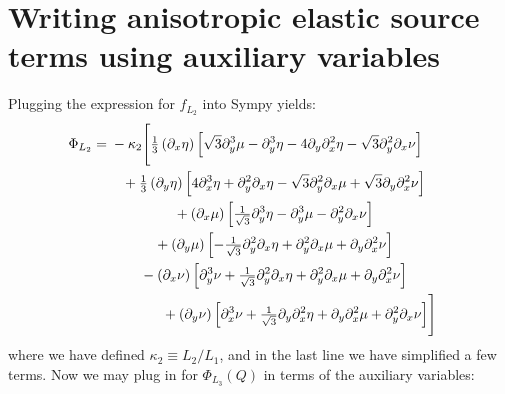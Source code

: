 \documentclass[reqno]{article}
\begin{document}
\section{Writing anisotropic elastic source terms using auxiliary variables}
Plugging the expression for $f_{L_2}$ into Sympy yields:
\begin{equation}
\begin{split}
	\Phi_{L_2} 
	&=
	\begin{multlined}[t]
	- \kappa_2 \Biggl[
	\tfrac13 \left(\partial_x \eta\right) \Bigl[
	\sqrt3 \partial_y^3 \mu
	- \partial_y^3 \eta 
	- 4 \partial_y \partial_x^2 \eta 
	- \sqrt3 \partial_y^2 \partial_x \nu
	\Bigr] \\ 
	+ \tfrac13 \left(\partial_y \eta\right) \Bigl[
	4 \partial_x^3 \eta
	+  \partial_y^2 \partial_x \eta
	- \sqrt3 \partial_y^2 \partial_x \mu
	+ \sqrt3 \partial_y \partial_x^2 \nu 
	\Bigr] \\
	+ \left(\partial_x \mu\right) \Bigl[
	\tfrac{1}{\sqrt3} \partial_y^3 \eta
	- \partial_y^3 \mu 
	- \partial_y^2 \partial_x \nu
	\Bigr] \\
	+ \left(\partial_y \mu \right) \Bigl[
	- \tfrac{1}{\sqrt3} \partial_y^2 \partial_x \eta 
	+ \partial_y^2 \partial_x \mu 
	+ \partial_y \partial_x^2 \nu 
	\Bigr] \\
	- \left(\partial_x \nu \right) \Bigl[
	\partial_y^3 \nu 
	+ \tfrac{1}{\sqrt3} \partial_y^2 \partial_x \eta
	+ \partial_y^2 \partial_x \mu 
	+ \partial_y \partial_x^2 \nu
	\Bigr] \\
	+ \left(\partial_y \nu\right) \Bigl[
	\partial_x^3 \nu 
	+ \tfrac{1}{\sqrt3}  \partial_y \partial_x^2 \eta
	+ \partial_y \partial_x^2 \mu 
	+ \partial_y^2 \partial_x \nu
	\Bigr]
	\Biggr]
	\end{multlined}
\end{split}
\end{equation}
where we have defined $\kappa_2 \equiv L_2/L_1$, and in the last line we have simplified a few terms.
Now we may plug in for $\Phi_{L_3}(Q)$ in terms of the auxiliary variables:
\end{document}
